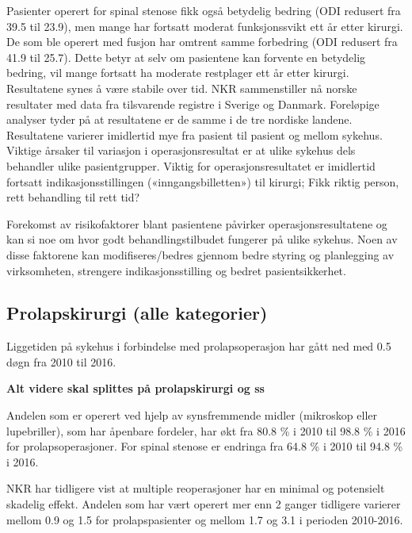 \documentclass [norsk,a4paper,twoside]{article}\usepackage[]{graphicx}\usepackage[]{color}
\begin{document}
Pasienter operert for spinal stenose fikk også
betydelig bedring (ODI redusert fra 39.5 til 23.9), men mange har fortsatt moderat
funksjonssvikt ett år etter kirurgi. 
De som ble operert med fusjon har
omtrent samme forbedring (ODI redusert fra 41.9 til 25.7). Dette betyr at selv om
pasientene kan forvente en betydelig bedring, vil mange fortsatt ha moderate restplager
ett år etter kirurgi. Resultatene synes å være stabile over tid. NKR
sammenstiller nå norske resultater med data fra tilsvarende registre i Sverige og
Danmark. Foreløpige analyser tyder på at resultatene er de samme i
de tre nordiske landene.
Resultatene varierer imidlertid mye fra pasient til pasient og mellom sykehus.
Viktige årsaker til variasjon i operasjonsresultat er at ulike sykehus dels behandler
ulike pasientgrupper. Viktig for operasjonsresultatet er imidlertid fortsatt
indikasjonsstillingen («inngangsbilletten») til kirurgi; Fikk riktig person, rett
behandling til rett tid?

Forekomst av risikofaktorer blant pasientene påvirker operasjonsresultatene og kan
si noe om hvor godt behandlingstilbudet fungerer på ulike sykehus. Noen av disse
faktorene kan modifiseres/bedres gjennom bedre styring og planlegging av
virksomheten, strengere indikasjonsstilling og bedret pasientsikkerhet.


\subsection{Prolapskirurgi (alle kategorier)}



Liggetiden på sykehus i forbindelse med prolapsoperasjon har gått ned med 0.5 døgn fra 2010 til 2016.



\textbf{Alt videre skal splittes på prolapskirurgi og ss}



Andelen som er operert ved hjelp av synsfremmende midler (mikroskop eller
lupebriller), som har åpenbare fordeler, har økt fra 80.8 \% i 2010 til 
98.8 \% i 2016 for prolapsoperasjoner. For spinal stenose er endringa fra 64.8 \% i 2010 til 
94.8 \% i 2016.

NKR har tidligere vist at multiple reoperasjoner har en minimal og potensielt skadelig
effekt. Andelen som har vært operert mer enn 2 ganger tidligere varierer mellom 0.9 
og 1.5 for prolapspasienter og mellom 1.7 
og 3.1 i perioden 2010-2016. 
\end{document}
